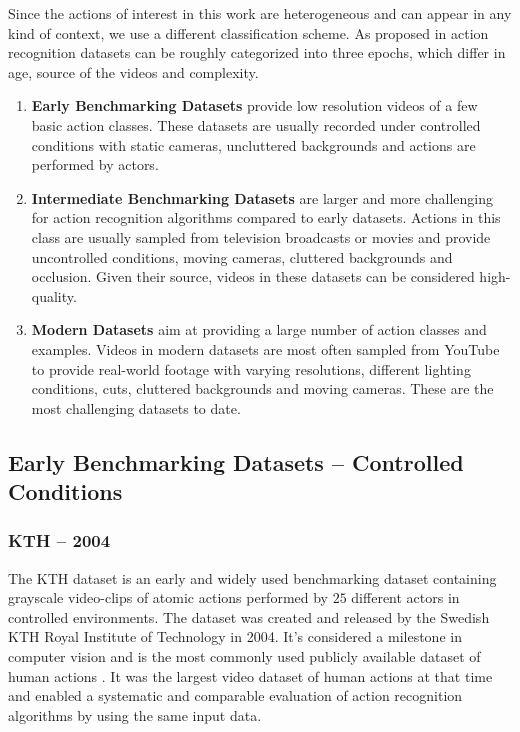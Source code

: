 Since the actions of interest in this work are heterogeneous and can appear in any kind of context, we use a different classification scheme.
As proposed in \cite{hassner_critical_2013} action recognition datasets can be roughly categorized into three epochs, which differ in age, source of the videos and complexity.
\begin{enumerate}
    \item \textbf{Early Benchmarking Datasets} provide low resolution videos of a few basic action classes. These datasets are usually recorded under controlled conditions with static cameras, uncluttered backgrounds and actions are performed by actors.
    \item \textbf{Intermediate Benchmarking Datasets} are larger and more challenging for action recognition algorithms compared to early datasets. Actions in this class are usually sampled from television broadcasts or movies and provide uncontrolled conditions, moving cameras, cluttered backgrounds and occlusion. Given their source, videos in these datasets can be considered high-quality.
    \item \textbf{Modern Datasets} aim at providing a large number of action classes and examples. Videos in modern datasets are most often sampled from YouTube to provide real-world footage with varying resolutions, different lighting conditions, cuts, cluttered backgrounds and moving cameras. These are the most challenging datasets to date.
\end{enumerate}


\subsection{Early Benchmarking Datasets -- Controlled Conditions}

\subsubsection{KTH -- 2004}
The KTH dataset \cite{schuldt_recognizing_2004} is an early and widely used benchmarking dataset containing grayscale video-clips of atomic actions performed by $25$ different actors in controlled environments.
The dataset was created and released by the Swedish KTH Royal Institute of Technology in 2004.
It's considered a milestone in computer vision \cite{chaquet_survey_2013} and is the most commonly used publicly available dataset of human actions \cite{baccouche_sequential_2011}.
It was the largest video dataset of human actions at that time and enabled a systematic and comparable evaluation of action recognition algorithms by using the same input data.

